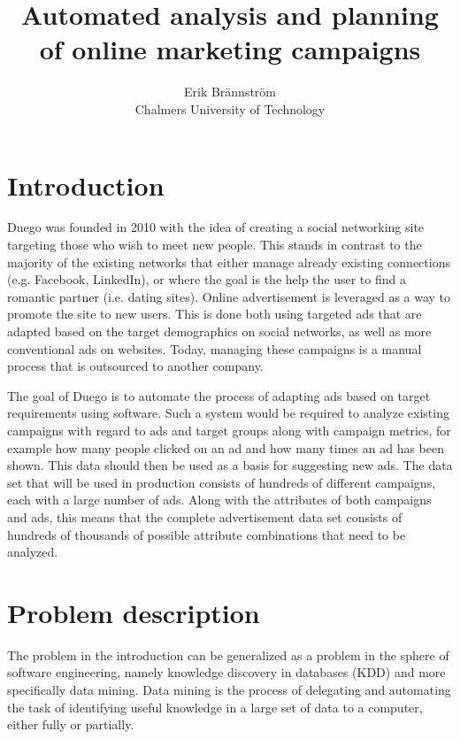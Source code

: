 \documentclass[a4paper]{article}
\begin{document}
\title{Automated analysis and planning of online marketing campaigns}
\author{Erik Brännström\\
  Chalmers University of Technology}
\date{}
\maketitle

\section{Introduction}
Duego was founded in 2010 with the idea of creating a social networking site targeting those who wish to meet new people. This stands in contrast to the majority of the existing networks that either manage already existing connections (e.g. Facebook, LinkedIn), or where the goal is the help the user to find a romantic partner (i.e. dating sites). Online advertisement is leveraged as a way to promote the site to new users. This is done both using targeted ads that are adapted based on the target demographics on social networks, as well as more conventional ads on websites. Today, managing these campaigns is a manual process that is outsourced to another company.

The goal of Duego is to automate the process of adapting ads based on target requirements using software. Such a system would be required to analyze existing campaigns with regard to ads and target groups along with campaign metrics, for example how many people clicked on an ad and how many times an ad has been shown. This data should then be used as a basis for suggesting new ads. The data set that will be used in production consists of hundreds of different campaigns, each with a large number of ads. Along with the attributes of both campaigns and ads, this means that the complete advertisement data set consists of hundreds of thousands of possible attribute combinations that need to be analyzed.

\section{Problem description}
The problem in the introduction can be generalized as a problem in the sphere of software engineering, namely knowledge discovery in databases (KDD) and more specifically data mining. Data mining is the process of delegating and automating the task of identifying useful knowledge in a large set of data to a computer, either fully or  partially.
\end{document}
